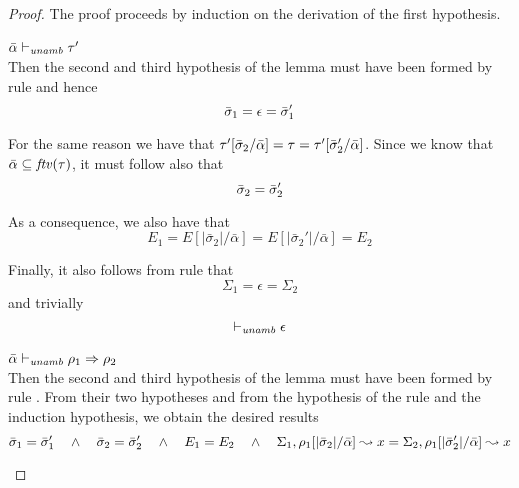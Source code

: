 \begin{proof}
The proof proceeds by induction on the derivation of the first hypothesis.
\begin{description}
\setlength{\itemsep}{1em}
\item[\fbox{\texttt{(UA-Simp)}}]\quad$\bar{\alpha} \vdash_{\mathit{unamb}} \tau'$ \ \\
  Then the second and third hypothesis of the lemma must have been formed by rule 
  and hence 
\begin{equation*}
  \bar{\sigma}_1 = \epsilon = \bar{\sigma}_1'
\end{equation*}
  
  For the same reason we have that $\tau'[\bar{\sigma}_2/\bar{\alpha}] = \tau = \tau'[\bar{\sigma}_2'/\bar{\alpha}]$. Since we know that $\bar{\alpha} \subseteq \mathit{ftv}(\tau)$, it must follow also that
\begin{equation*}
  \bar{\sigma}_2 = \bar{\sigma}_2'
\end{equation*}

  As a consequence, we also have that
\begin{equation*}
  E_1 = E[|\bar{\sigma}_2|/\bar{\alpha}] = E[|\bar{\sigma}_2'|/\bar{\alpha}] = E_2
\end{equation*}

  Finally, it also follows from rule  that
\begin{equation*}
  \Sigma_1 = \epsilon = \Sigma_2
\end{equation*}
  and trivially
\begin{equation*}
  \vdash_{\mathit{unamb}} \epsilon
\end{equation*}

\item[\fbox{\texttt{(UA-IAbs)}}]\quad$\bar{\alpha} \vdash_{\mathit{unamb}} \rho_1 \Rightarrow \rho_2$ \ \\
  Then the second and third hypothesis of the lemma must have been formed by rule .
  From their two hypotheses and from the hypothesis of the rule and the induction hypothesis, we obtain
  the desired results
\begin{equation*}
  \bar{\sigma}_1 = \bar{\sigma}_1' \quad\wedge\quad \bar{\sigma}_2 = \bar{\sigma}_2'
  \quad\wedge\quad 
  E_1 = E_2
  \quad\wedge\quad
  \Sigma_1, \rho_1[|\bar{\sigma}_2|/\bar{\alpha}]\leadsto x
  = 
  \Sigma_2, \rho_1[|\bar{\sigma}_2'|/\bar{\alpha}]\leadsto x
\end{equation*}


\end{description}
\end{proof}
